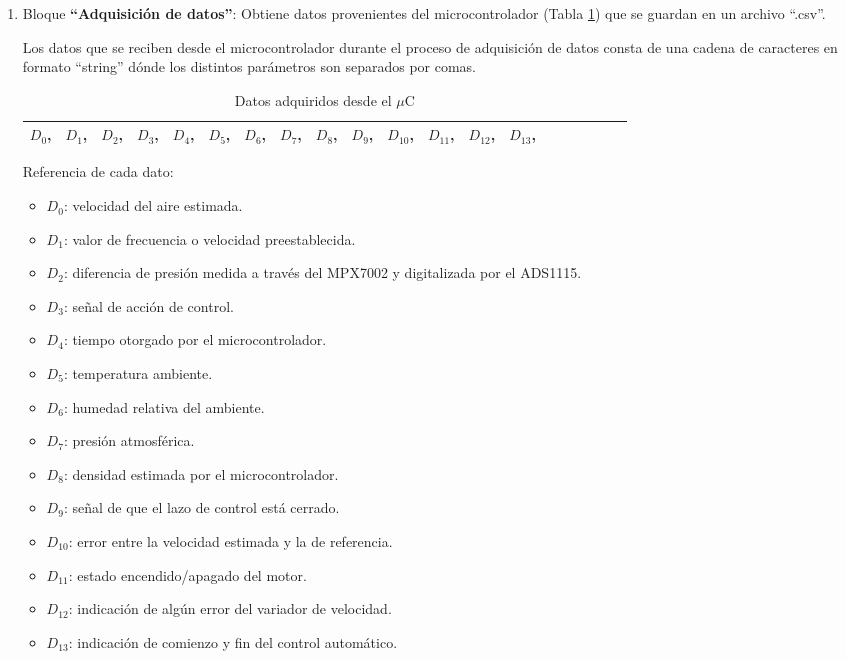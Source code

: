 \begin{enumerate}
\item Bloque \textbf{“Adquisición de datos”}: 
\subitem Obtiene datos provenientes del microcontrolador (Tabla \ref{tab:Datosdesde}) que se guardan en un archivo “.csv”. 
 
Los datos que se reciben desde el microcontrolador durante el proceso de adquisición de datos consta de una cadena de caracteres en formato “string” dónde los distintos parámetros son separados por comas.
\begin{table}[H]
	\centering
	\begin{tabular}{|l|l|l|l|l|l|l|l|l|l|l|l|l|l|l|l|l|l|l|l|}
		\hline
		$D_0$,&$D_1$,&$D_2$,&$D_3$,&$D_4$,&$D_5$,&$D_6$,&$D_7$,&$D_8$,&$D_9$,&$D_{10}$,&$D_{11}$,&$D_{12}$,&$D_{13}$,  \\ \hline
	\end{tabular}
\caption{Datos adquiridos desde el $\mu$C}
\label{tab:Datosdesde}
\end{table}

Referencia de cada dato:
	\begin{itemize}
	\item $D_0$: velocidad del aire estimada.
	\item 	$D_1$: valor de frecuencia o velocidad preestablecida.
	\item 	$D_2$: diferencia de presión medida a través del MPX7002 y digitalizada por el ADS1115.
	\item 	$D_3$: señal de acción de control.
	\item 	$D_4$: tiempo otorgado por el microcontrolador.
	\item 	$D_5$: temperatura ambiente.
	\item 	$D_6$: humedad relativa del ambiente.
	\item 	$D_7$: presión atmosférica.
	\item 	$D_8$: densidad estimada por el microcontrolador.
	\item 	$D_9$: señal de que el lazo de control está cerrado.
	\item 	$D_{10}$: error entre la velocidad estimada y la de referencia.
	\item 	$D_{11}$: estado encendido/apagado del motor.
	\item 	$D_{12}$: indicación de algún error del variador de velocidad.
	\item 	$D_{13}$: indicación de comienzo y fin del control automático.
	\end{itemize}	



\end{enumerate}
